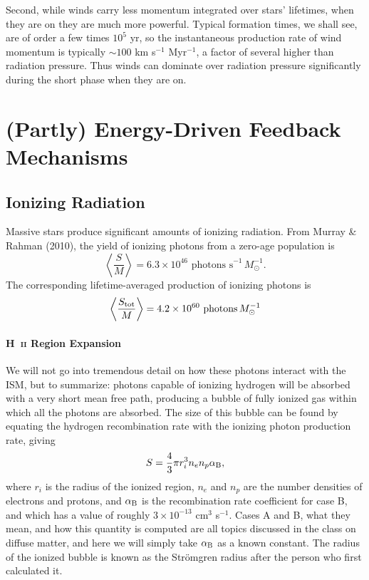 Second, while winds carry less momentum integrated over stars' lifetimes, when they are on they are much more powerful. Typical formation times, we shall see, are of order a few times $10^5$ yr, so the instantaneous production rate of wind momentum is typically $\sim 100$ km s$^{-1}$ Myr$^{-1}$, a factor of several higher than radiation pressure. Thus winds can dominate over radiation pressure significantly during the short phase when they are on.

\section{(Partly) Energy-Driven Feedback Mechanisms}

\subsection{Ionizing Radiation}

Massive stars produce significant amounts of ionizing radiation. From Murray \& Rahman (2010), the yield of ionizing photons from a zero-age population is
\begin{equation}
\left\langle\frac{S}{M}\right\rangle = 6.3\times 10^{46}\mbox{ photons s}^{-1}\,M_\odot^{-1}.
\end{equation}
The corresponding lifetime-averaged production of ionizing photons is
\begin{equation}
\left\langle \frac{S_{\rm tot}}{M}\right\rangle = 4.2\times 10^{60}\mbox{ photons}\,M_{\odot}^{-1}
\end{equation}

\paragraph{H~\textsc{ii} Region Expansion}

We will not go into tremendous detail on how these photons interact with the ISM, but to summarize: photons capable of ionizing hydrogen will be absorbed with a very short mean free path, producing a bubble of fully ionized gas within which all the photons are absorbed. The size of this bubble can be found by equating the hydrogen recombination rate with the ionizing photon production rate, giving
\begin{equation}
S = \frac{4}{3} \pi r_i^3 n_e n_p \alpha_{\mathrm{B}},
\end{equation}
where $r_i$ is the radius of the ionized region, $n_e$ and $n_p$ are the number densities of electrons and protons, and $\alpha_{\mathrm{B}}$ is the recombination rate coefficient for case B, and which has a value of roughly $3\times 10^{-13}$ cm$^3$ s$^{-1}$. Cases A and B, what they mean, and how this quantity is computed are all topics discussed in the class on diffuse matter, and here we will simply take $\alpha_{\mathrm{B}}$ as a known constant. The radius of the ionized bubble is known as the Str\"omgren radius after the person who first calculated it.

